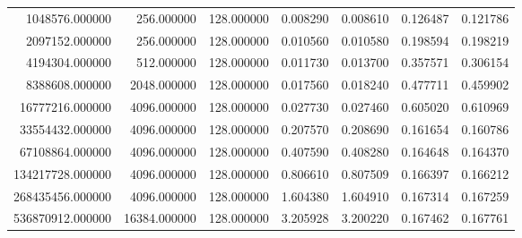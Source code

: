 \begin{tabular}{rrrrrrr}
1048576.000000 & 256.000000 & 128.000000 & 0.008290 & 0.008610 & 0.126487 & 0.121786 \\
2097152.000000 & 256.000000 & 128.000000 & 0.010560 & 0.010580 & 0.198594 & 0.198219 \\
4194304.000000 & 512.000000 & 128.000000 & 0.011730 & 0.013700 & 0.357571 & 0.306154 \\
8388608.000000 & 2048.000000 & 128.000000 & 0.017560 & 0.018240 & 0.477711 & 0.459902 \\
16777216.000000 & 4096.000000 & 128.000000 & 0.027730 & 0.027460 & 0.605020 & 0.610969 \\
33554432.000000 & 4096.000000 & 128.000000 & 0.207570 & 0.208690 & 0.161654 & 0.160786 \\
67108864.000000 & 4096.000000 & 128.000000 & 0.407590 & 0.408280 & 0.164648 & 0.164370 \\
134217728.000000 & 4096.000000 & 128.000000 & 0.806610 & 0.807509 & 0.166397 & 0.166212 \\
268435456.000000 & 4096.000000 & 128.000000 & 1.604380 & 1.604910 & 0.167314 & 0.167259 \\
536870912.000000 & 16384.000000 & 128.000000 & 3.205928 & 3.200220 & 0.167462 & 0.167761 \\
\bottomrule
\end{tabular}
